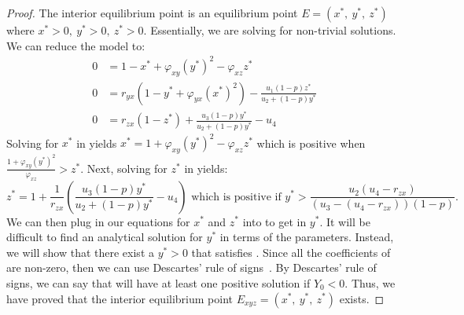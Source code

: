 \begin{proof}
    The interior equilibrium point is an equilibrium point $E=\left(x^*,\ y^*,\ z^*\right)$ where $x^*>0,\ y^*>0,\ z^*>0$. Essentially, we are solving  for non-trivial solutions. We can reduce the model to:
    \begin{subequations}\label{system:interior}
        \begin{align}
            0 &= 1-x^*+\varphi_{xy}\left(y^*\right)^2-\varphi_{xz}z^* \label{eq:interior-x}\\
            0 &= r_{yx}\left(1-y^*+\varphi_{yx}\left(x^*\right)^2\right)-\frac{u_1\left(1-p\right)z^*}{u_2+\left(1-p\right)y^*} \label{eq:interior-y}\\
            0 &= r_{zx}\left(1-z^*\right)+\frac{u_3\left(1-p\right)y^*}{u_2+\left(1-p\right)y^*}-u_4 \label{eq:interior-z}
        \end{align}
    \end{subequations}
    Solving for $x^*$ in  yields $x^*=1+\varphi_{xy}\left(y^*\right)^2-\varphi_{xz}z^*$ which is positive when $\frac{1+\varphi_{xy}\left(y^*\right)^2}{\varphi_{xz}}>z^*$. Next, solving for $z^*$ in  yields:
    \begin{equation*}
        z^*=1+\frac{1}{r_{zx}}\left(\frac{u_3\left(1-p\right)y^*}{u_2+\left(1-p\right)y^*}-u_4\right)\text{ which is positive if }y^*>\frac{u_2\left(u_4-r_{zx}\right)}{\left(u_3-\left(u_4-r_{zx}\right)\right)\left(1-p\right)}.
    \end{equation*}
    We can then plug in our equations for $x^*$ and $z^*$ into  to get  in $y^*$. It will be difficult to find an analytical solution for $y^*$ in terms of the parameters. Instead, we will show that there exist a $y^*>0$ that satisfies . Since all the coefficients of  are non-zero, then we can use Descartes' rule of signs~\cite{WANG2004525526}. By Descartes' rule of signs, we can say that  will have at least one positive solution if $Y_0<0$. Thus, we have proved that the interior equilibrium point $E_{xyz}=\left(x^*,\ y^*,\ z^*\right)$ exists.
\end{proof}


